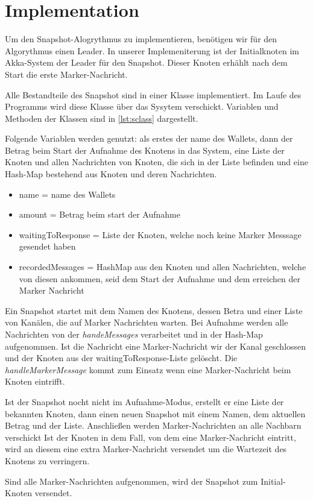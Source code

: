\section{Implementation}
\label{sec:impl}
Um den Snapshot-Alogrythmus zu implementieren, benötigen wir für den
Algorythmus einen Leader. In unserer Implemeniterung ist der Initialknoten im
Akka-System der Leader für den Snapshot. Dieser Knoten erhählt nach dem Start
die erste Marker-Nachricht.

Alle Bestandteile des Snapshot sind in einer Klasse implementiert. Im Laufe
des Programms wird diese Klasse über das Sysytem verschickt.
Variablen und Methoden der Klassen sind in \ref{lst:sclass} dargestellt.

Folgende Variablen werden genutzt: als erstes der name des Wallets, dann
der Betrag beim Start der Aufnahme des Knotens in das System, eine Liste der
Knoten und allen Nachrichten von Knoten, die sich in der Liste befinden und
eine Hash-Map bestehend aus Knoten und deren Nachrichten.

\begin{itemize}
 \item name = name des Wallets
 \item amount = Betrag beim start der Aufnahme
 \item waitingToResponse = Liste der Knoten, welche noch keine Marker Messsage
  gesendet haben
 \item recordedMessages = HashMap aus den Knoten und allen Nachrichten, welche
  von diesen ankommen, seid dem Start der Aufnahme und dem erreichen der
   Marker Nachricht
\end{itemize}

Ein Snapshot startet mit dem Namen des Knotens, dessen Betra und einer Liste
von Kanälen, die auf Marker Nachrichten warten.
Bei Aufnahme werden alle Nachrichten von der \textit{handeMessages}
verarbeitet und in der Hash-Map aufgenommen.
Ist die Nachricht eine Marker-Nachricht wir der Kanal geschlossen und der
Knoten aus der waitingToResponse-Liste gelöscht.
Die \textit{handleMarkerMessage} kommt zum Einsatz wenn eine Marker-Nachricht
beim Knoten eintrifft.

Ist der Snapshot nocht nicht im Aufnahme-Modus, erstellt er eine Liste der
bekannten Knoten, dann einen neuen Snapshot mit einem Namen, dem aktuellen
Betrag und der Liste. Anschließen werden Marker-Nachrichten an alle Nachbarn
verschickt
Ist der Knoten in dem Fall, von dem eine Marker-Nachricht eintritt, wird
an diesem eine extra Marker-Nachricht versendet um die Wartezeit des
Knotens zu verringern.

Sind alle Marker-Nachrichten aufgenommen, wird der Snapshot zum Initial-Knoten
versendet.
